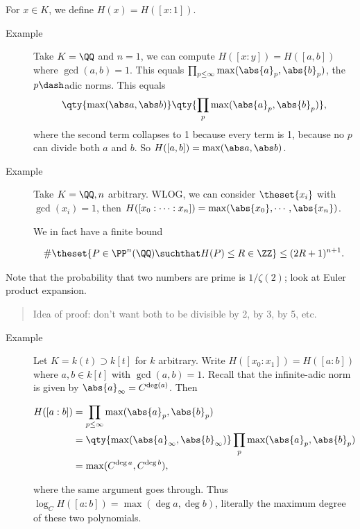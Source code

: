 For \(x\in K\), we define \(H(x) = H([x: 1])\).

\begin{description}
\item[Example]
Take \(K = \QQ\) and \(n=1\), we can compute \(H([x: y]) = H([a, b])\)
where \(\gcd(a, b) = 1\). This equals
\(\prod_{p\leq \infty} \max(\abs{a}_p, \abs{b}_p)\), the \(p\dash\)adic
norms. This equals
\begin{align*}
\qty{\max(\abs a, \abs b)} \qty{ \prod_p \max(\abs{a}_p, \abs{b}_p)  }
,\end{align*} where the second term collapses to 1 because every term is
1, because no \(p\) can divide both \(a\) and \(b\). So
\(H([a, b]) = \max(\abs a, \abs b)\).
\item[Example]
Take \(K=\QQ, n\) arbitrary. WLOG, we can consider \(\theset{x_i}\) with
\(\gcd(x_i) = 1\), then
\(H([x_0: \cdots : x_n]) = \max(\abs{x_0}, \cdots, \abs{x_n})\).

We in fact have a finite bound

\begin{align*}
\#\theset{P \in \PP^n(\QQ) \suchthat H(P) \leq R \in \ZZ} \leq (2R + 1)^{n+1} 
.\end{align*}
\end{description}

Note that the probability that two numbers are prime is \(1/\zeta(2)\);
look at Euler product expansion.

\begin{quote}
Idea of proof: don't want both to be divisible by 2, by 3, by 5, etc.
\end{quote}

\begin{description}
\item[Example]
Let \(K = k(t) \supset k[t]\) for \(k\) arbitrary. Write
\(H([x_0: x_1]) = H([a:b])\) where \(a, b\in k[t]\) with
\(\gcd(a, b) = 1\). Recall that the infinite-adic norm is given by
\(\abs{a}_\infty = C^{\deg(a)}\). Then

\begin{align*}
H([a: b]) &= \prod_{p\leq \infty} \max(\abs{a}_p, \abs{b}_p) \\
&= \qty{ \max(\abs{a}_\infty,\abs{b}_\infty)} \prod_p \max(\abs{a}_p, \abs{b}_p) \\
&= \max(C^{\deg a}, C^{\deg b})
,\end{align*}

where the same argument goes through. Thus
\(\log_C H([a: b]) = \max(\deg a, \deg b)\), literally the maximum
degree of these two polynomials.
\end{description}

